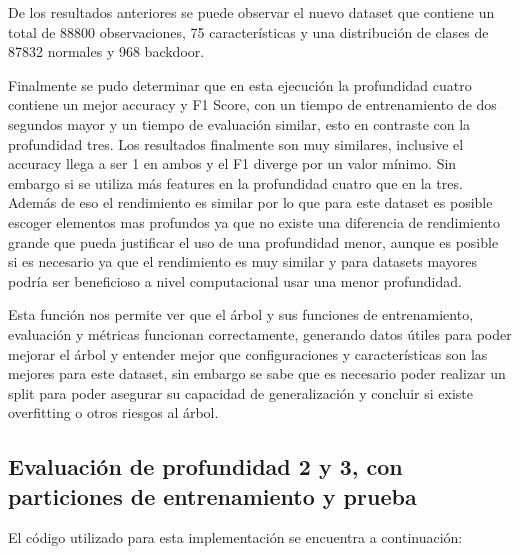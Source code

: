 \documentclass[12pt,a4paper]{article}
\begin{document}
De los resultados anteriores se puede observar el nuevo dataset que contiene un total de 88800 observaciones, 75 características y
una distribución de clases de 87832 normales y 968 backdoor.

Finalmente se pudo determinar que en esta ejecución la profundidad cuatro contiene un mejor accuracy y F1 Score, con un tiempo de entrenamiento
de dos segundos mayor y un tiempo de evaluación similar, esto en contraste con la profundidad tres. Los resultados finalmente son muy similares,
inclusive el accuracy llega a ser 1 en ambos y el F1 diverge por un valor mínimo. Sin embargo si se utiliza más features en la profundidad cuatro que en la tres.
Además de eso el rendimiento es similar por lo que para este dataset es posible escoger elementos mas profundos ya que no existe una diferencia de rendimiento
grande que pueda justificar el uso de una profundidad menor, aunque es posible si es necesario ya que el rendimiento es muy similar y para datasets mayores podría ser
beneficioso a nivel computacional usar una menor profundidad.

Esta función nos permite ver que el árbol y sus funciones de entrenamiento, evaluación y métricas funcionan correctamente, generando
datos útiles para poder mejorar el árbol y entender mejor que configuraciones y características son las mejores para este dataset, sin embargo se sabe que
es necesario poder realizar un split para poder asegurar su capacidad de generalización y concluir si existe overfitting o otros riesgos al árbol.

\subsection{Evaluación de profundidad 2 y 3, con particiones de entrenamiento y prueba}\label{subsec:evaluacion-de-profundidad-2-y-3-con-particiones-de-entrenamiento-y-prueba}

El código utilizado para esta implementación se encuentra a continuación:
\end{document}
